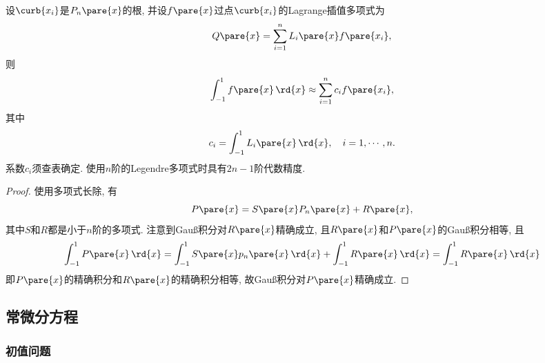 \documentclass{ctexart}
\begin{document}
\begin{theorem}[Gau\ss 积分]
    设$\curb{x_i}$是$P_n\pare{x}$的根, 并设$f\pare{x}$过点$\curb{x_i}$的Lagrange插值多项式为
    \[ Q\pare{x} = \sum_{i=1}^n L_i\pare{x}f\pare{x_i}, \]
    则
    \[ \int_{-1}^1 f\pare{x}\,\rd{x} \approx \sum_{i=1}^n c_i f\pare{x_i}, \]
    其中
    \[ c_i = \int_{-1}^1 L_i\pare{x}\,\rd{x},\quad i = 1,\cdots,n. \]
    系数$c_i$须查表确定. 使用$n$阶的Legendre多项式时具有$2n-1$阶代数精度.
\end{theorem}
\begin{proof}
    使用多项式长除, 有
    \[ P\pare{x} = S\pare{x}P_n\pare{x} + R\pare{x}, \]
    其中$S$和$R$都是小于$n$阶的多项式. 注意到Gau\ss 积分对$R\pare{x}$精确成立, 且$R\pare{x}$和$P\pare{x}$的Gau\ss 积分相等, 且
    \[ \int_{-1}^1 P\pare{x}\,\rd{x} = \int_{-1}^1 S\pare{x}p_n\pare{x}\,\rd{x} + \int_{-1}^1 R\pare{x}\,\rd{x} = \int_{-1}^1 R\pare{x}\,\rd{x} \]
    即$P\pare{x}$的精确积分和$R\pare{x}$的精确积分相等, 故Gau\ss 积分对$P\pare{x}$精确成立.
\end{proof}



\subsection{常微分方程} %
\label{sub:常微分方程}

\subsubsection{初值问题} %
\label{ssub:初值问题}
\end{document}
